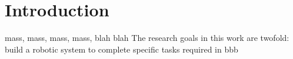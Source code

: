 \chapter{Introduction}
\label{chap:introduction}
\gls{mass}, \gls{mass}, \gls{mass}, \gls{mass}, blah blah
The research goals in this work are twofold: build a robotic system to complete specific tasks required in bbb
